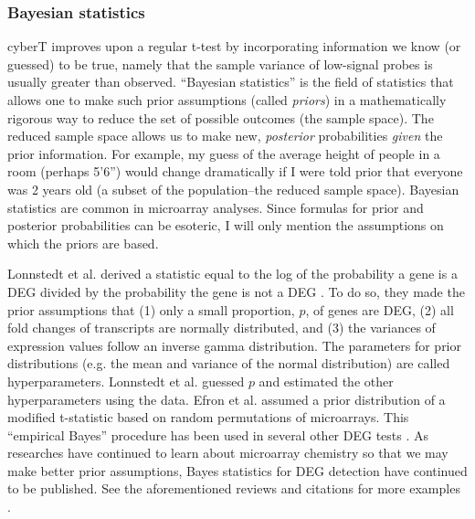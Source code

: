 \subsubsection{Bayesian statistics}
cyberT improves upon a regular t-test by incorporating
information we know (or guessed) to be true, namely that the sample variance of low-signal
probes is usually greater than observed. ``Bayesian statistics'' is the field
of statistics that allows one to make such prior assumptions (called \textit{priors})
in a mathematically rigorous way
to reduce the set of possible outcomes (the sample space). The reduced sample
space allows us to make new, \textit{posterior} 
probabilities \textit{given} the prior information. For example, my
guess of the average height of people in a room (perhaps 5'6'') would
change dramatically if I were told prior that everyone 
was 2 years old (a subset of the population--the reduced sample space). Bayesian statistics
are common in microarray analyses. Since formulas
for prior and posterior probabilities can be esoteric, I will only
mention the assumptions on which the priors are based.

Lonnstedt et al. derived a statistic equal to the log of the 
probability a gene is a DEG divided by the probability the gene is not a DEG \cite{Lonnstedt:2002wu}.
To do so, they made the prior assumptions that (1) only a small proportion, $p$, of 
genes are DEG, (2) all fold changes of transcripts are normally distributed,
and (3) the variances of expression values follow an inverse gamma distribution.
The parameters for prior
distributions (e.g. the mean and variance of 
the normal distribution) are 
called hyperparameters. Lonnstedt et al. guessed $p$ and estimated
the other hyperparameters using the data. Efron et al.
assumed a prior distribution of a modified t-statistic
based on random permutations of microarrays. This ``empirical
Bayes'' procedure has been used in several other DEG tests \cite{Efron:2001uu}.
As researches have continued to learn about microarray chemistry so that
we may make better prior assumptions, Bayes statistics for DEG detection
have continued to be published. See
the aforementioned reviews and citations for more examples 
\cite{Newton:2001te,Murie:2008iz,Jain:2003kh,Yu:2011vo,
Astrand:2008jk,Newton:2004cp,Gottardo:2003hb,Efron:2002bz,Townsend:2002tf}.


